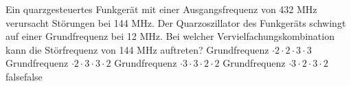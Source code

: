     {Ein quarzgesteuertes Funkgerät mit einer Ausgangsfrequenz von 432 MHz verursacht Störungen bei 144 MHz. Der Quarzoszillator des Funkgeräts schwingt auf einer Grundfrequenz bei 12 MHz.  Bei welcher Vervielfachungskombination kann die Störfrequenz von 144 MHz auftreten?  }
    {Grundfrequenz $\cdot 2 \cdot 2 \cdot 3 \cdot 3$}
    {Grundfrequenz $\cdot 2 \cdot 3 \cdot 3 \cdot 2$}
    {Grundfrequenz $\cdot 3 \cdot 3 \cdot 2\cdot 2$}
    {Grundfrequenz $\cdot 3 \cdot 2 \cdot 3 \cdot 2$}
    {false}{false}